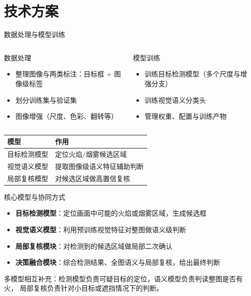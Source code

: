 \documentclass{beamer}
\begin{document}
\section{技术方案}
\begin{frame}{数据处理与模型训练}
  \begin{columns}[t]
      \begin{block}{数据处理}
        \small
        \begin{itemize}
          \item 整理图像与两类标注：目标框 + 图像级标签
          \item 划分训练集与验证集
          \item 图像增强（尺度、色彩、翻转等）
        \end{itemize}
      \end{block}
      \begin{block}{模型训练}
        \small
        \begin{itemize}
          \item 训练目标检测模型（多个尺度与增强分支）
          \item 训练视觉语义分类头
          \item 管理权重、配置与训练产物
        \end{itemize}
      \end{block}
  \end{columns}
  \vspace{0.4em}
  \begin{center}
    \small
    \begin{tabular}{ll}
      \toprule
      模型 & 作用 \\
      \midrule
      目标检测模型 & 定位火焰/烟雾候选区域 \\
      视觉语义模型 & 提取图像级语义特征辅助判断 \\
      局部复核模型 & 对候选区域做高置信复核 \\
      \bottomrule
    \end{tabular}
  \end{center}
\end{frame}

\begin{frame}{核心模型与协同方式}
  \begin{itemize}
    \item \textbf{目标检测模型}：定位画面中可能的火焰或烟雾区域，生成候选框
    \item \textbf{视觉语义模型}：利用预训练视觉特征对整图做语义级判断
    \item \textbf{局部复核模块}：对检测到的候选区域做局部二次确认
    \item \textbf{决策融合模块}：综合检测结果、全图语义与局部复核，给出最终判断
  \end{itemize}
  \begin{block}{}
    \small 多模型相互补充：检测模型负责可疑目标的定位，语义模型负责判读整图是否有火，
    局部复核负责针对小目标或遮挡情况下的判断。
  \end{block}
\end{frame}
\end{document}
